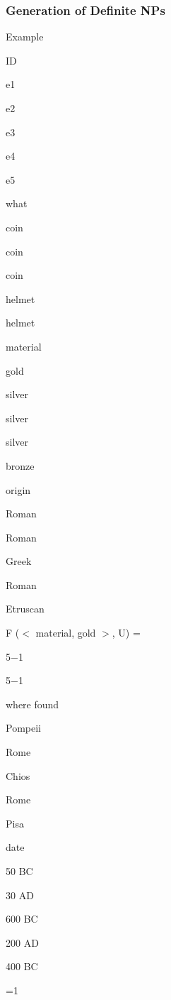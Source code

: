 \documentclass[compress,color=usenames]{beamer}
\begin{document}
\begin{frame}
\frametitle{Generation of Deﬁnite NPs}

Example

ID

e1

e2

e3

e4

e5

what

coin

coin

coin

helmet

helmet

material

gold

silver

silver

silver

bronze

origin

Roman

Roman

Greek

Roman

Etruscan

F ($<$ material, gold $>$, U) =

5$-$1

5$-$1

where found

Pompeii

Rome

Chios

Rome

Pisa

date

50 BC

30 AD

600 BC

200 AD

400 BC

=1

\end{frame}
\end{document}
